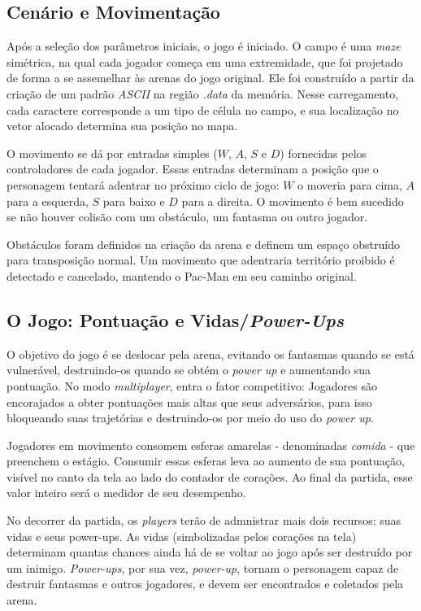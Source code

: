 \documentclass[12pt, a4paper, twocolumn]{article}
\begin{document}
\newpage

\subsection{Cenário e Movimentação}

Após a seleção dos parâmetros iniciais, o jogo é iniciado. O campo é uma \textit{maze} simétrica, na qual cada jogador começa em uma extremidade, que foi projetado de forma a se assemelhar às arenas do jogo original. Ele foi construído a partir da criação de um padrão \textit{ASCII} na região \textit{.data} da memória. Nesse carregamento, cada caractere corresponde a um tipo de célula no campo, e sua localização no vetor alocado determina sua posição no mapa.




O movimento se dá por entradas simples ($W$, $A$, $S$ e $D$) fornecidas pelos controladores de cada jogador. Essas entradas determinam a posição que o personagem tentará adentrar no próximo ciclo de jogo: $W$ o moveria para cima, $A$ para a esquerda, $S$ para baixo e $D$ para a direita. O movimento é bem sucedido se não houver colisão com um obstáculo, um fantasma ou outro jogador.

Obstáculos foram definidos na criação da arena e definem um espaço obstruído para transposição normal. Um movimento que adentraria território proibido é detectado e cancelado, mantendo o Pac-Man em seu caminho original.



\subsection{O Jogo: Pontuação e Vidas/\textit{Power-Ups}}
O objetivo do jogo é se deslocar pela arena, evitando os fantasmas quando se está vulnerável, destruindo-os quando se obtém o \textit{power up} e aumentando sua pontuação. No modo \textit{multiplayer}, entra o fator competitivo: Jogadores são encorajados a obter pontuações mais altas que seus adversários, para isso bloqueando suas trajetórias e destruindo-os por meio do uso do \textit{power up}.

Jogadores em movimento consomem esferas amarelas - denominadas \textit{comida} - que preenchem o estágio. Consumir essas esferas leva ao aumento de sua pontuação, visível no canto da tela ao lado do contador de corações. Ao final da partida, esse valor inteiro será o medidor de seu desempenho.

No decorrer da partida, os \textit{players} terão de admnistrar mais dois recursos: suas vidas e seus power-ups. As vidas (simbolizadas pelos corações na tela) determinam quantas chances ainda há de se voltar ao jogo após ser destruído por um inimigo. \textit{Power-ups}, por sua vez, \textit{power-up}, tornam o personagem capaz de destruir fantasmas e outros jogadores, e devem ser encontrados e coletados pela arena.
\end{document}
